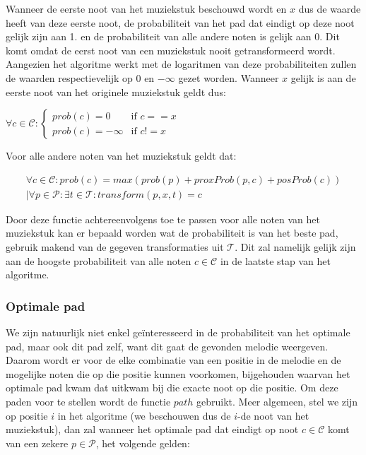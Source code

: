 Wanneer de eerste noot van het muziekstuk beschouwd wordt en $x$ dus de waarde heeft van deze eerste noot, de probabiliteit van het pad dat eindigt op deze noot gelijk zijn aan 1. en de probabiliteit van alle andere noten is gelijk aan 0. Dit komt omdat de eerst noot van een muziekstuk nooit getransformeerd wordt. Aangezien het algoritme werkt met de logaritmen van deze probabiliteiten zullen de waarden respectievelijk op 0 en $-\infty$ gezet worden. Wanneer $x$ gelijk is aan de eerste noot van het originele muziekstuk geldt dus:

\begin{framed}
\noindent
$\forall c\in \mathcal{C}: \begin{cases} 
prob(c)=0 &\mbox{if } c==x\\ 
prob(c)=-\infty &\mbox{if } c!=x \end{cases}$
\end{framed}

Voor alle andere noten van het muziekstuk geldt dat:

\begin{framed}
\noindent
\begin{multline}
\forall c\in \mathcal{C}: 
prob(c) = max(prob(p) + proxProb(p,c) + posProb(c)) \\
| \forall p\in \mathcal{P}: \exists t\in \mathcal{T}: transform(p,x,t)=c
\end{multline}
\end{framed}

Door deze functie achtereenvolgens toe te passen voor alle noten van het muziekstuk kan er bepaald worden wat de probabiliteit is van het beste pad, gebruik makend van de gegeven transformaties uit $\mathcal{T}$. Dit zal namelijk gelijk zijn aan de hoogste probabiliteit van alle noten $c\in \mathcal{C}$ in de laatste stap van het algoritme.

\subsubsection{Optimale pad}
We zijn natuurlijk niet enkel ge\"interesseerd in de probabiliteit van het optimale pad, maar ook dit pad zelf, want dit gaat de gevonden melodie weergeven. Daarom wordt er voor de elke combinatie van een positie in de melodie en de mogelijke noten die op die positie kunnen voorkomen, bijgehouden waarvan het optimale pad kwam dat uitkwam bij die exacte noot op die positie. Om deze paden voor te stellen wordt de functie $path$ gebruikt. Meer algemeen, stel we zijn op positie $i$ in het algoritme (we beschouwen dus de $i$-de noot van het muziekstuk), dan zal wanneer het optimale pad dat eindigt op noot $c\in \mathcal{C}$ komt van een zekere $p\in \mathcal{P}$, het volgende gelden:

